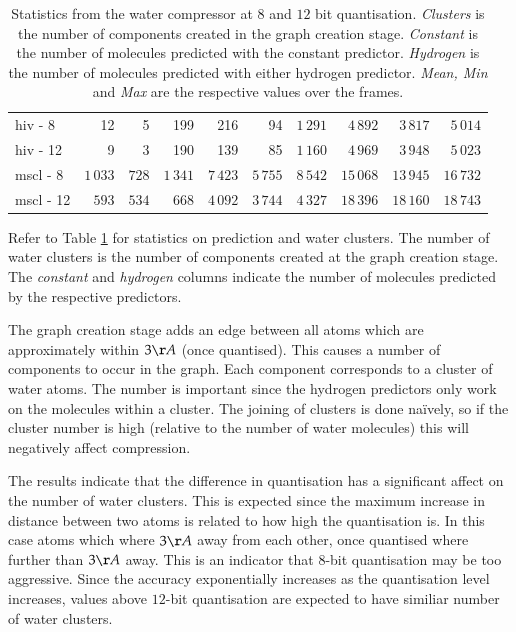 \documentclass[a4paper]{report}
\begin{document}
\begin{table}
{\begin{tabular}{|l|rrr|rrr|rrr|}
    \hline

    hiv - 8 & 12 & 5 & 199 & 216 & 94 & $1\,291$ & $4\,892$ & $3\,817$ &
    $5\,014$ \\

    hiv - 12 & 9 & 3 & 190 & 139 & 85 & $1\,160$ & $4\,969$ & $3\,948$ &
    $5\,023$ \\

    \hline

    mscl - 8 & $1\,033$ & $728$ & $1\,341$ & $7\,423$ & $5\,755$ & $8\,542$
    & $15\,068$ & $13\,945$ & $16\,732$ \\

    mscl - 12 & $593$ & $534$ & $668$ & $4\,092$ & $3\,744$ & $4\,327$ &
    $18\,396$ & $18\,160$ & $18\,743$ \\

    \hline

  \end{tabular}
}
\caption{Statistics from the water compressor at $8$ and $12$ bit
  quantisation. \emph{Clusters} is the number of components created in the
  graph creation stage. \emph{Constant} is the number of molecules predicted
  with the constant predictor. \emph{Hydrogen} is the number of molecules
  predicted with either hydrogen predictor. \emph{Mean, Min} and \emph{Max}
  are the respective values over the frames.}
\label{tab:predstats}
\end{table}

Refer to Table \ref{tab:predstats} for statistics on prediction and water
clusters. The number of water clusters is the number of components created at
the graph creation stage. The \emph{constant} and \emph{hydrogen} columns
indicate the number of molecules predicted by the respective predictors.

The graph creation stage adds an edge between all atoms which are
approximately within $3 \AA$ (once quantised). This causes a number of
components to occur in the graph. Each component corresponds to a cluster of
water atoms. The number is important since the hydrogen predictors only work
on the molecules within a cluster. The joining of clusters is done
na\"{i}vely, so if the cluster number is high (relative to the number of water
molecules) this will negatively affect compression.

The results indicate that the difference in quantisation has a significant
affect on the number of water clusters. This is expected since the maximum
increase in distance between two atoms is related to how high the quantisation
is. In this case atoms which where $3 \AA$ away from each other, once
quantised where further than $3 \AA$ away. This is an indicator that $8$-bit
quantisation may be too aggressive. Since the accuracy exponentially increases
as the quantisation level increases, values above $12$-bit quantisation are
expected to have similiar number of water clusters.
\end{document}
